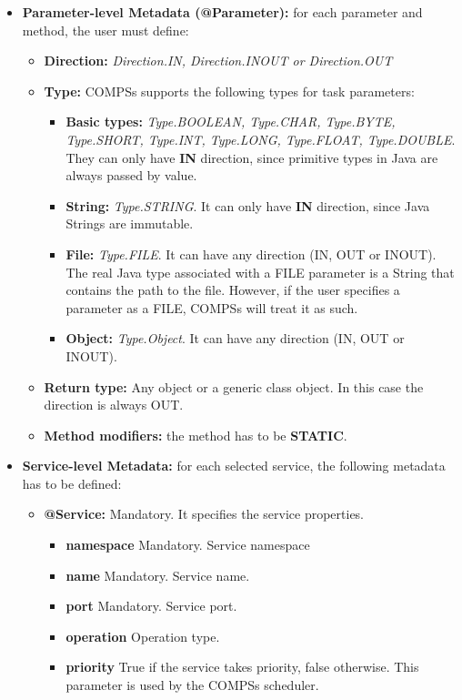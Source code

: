 \begin{itemize}
 \item {\bf Parameter-level Metadata (@Parameter):} for each parameter and method, the user must define:
       \begin{itemize}
        \item {\bf Direction:} {\it Direction.IN, Direction.INOUT or Direction.OUT}
        \item {\bf Type:} COMPSs supports the following types for task parameters:
              \begin{itemize}
               \item {\bf Basic types:} {\it Type.BOOLEAN, Type.CHAR, Type.BYTE, Type.SHORT, Type.INT, Type.LONG,
                     Type.FLOAT, Type.DOUBLE}. They can only have {\bf IN} direction, since primitive types in Java are
                     always passed by value.
               \item {\bf String:} {\it Type.STRING}. It can only have {\bf IN} direction, since Java Strings are immutable.
               \item {\bf File:} {\it Type.FILE}. It can have any direction (IN, OUT or INOUT). The real Java type associated
                     with a FILE parameter is a String that contains the path to the file. However, if the user specifies
                     a parameter as a FILE, COMPSs will treat it as such.
               \item {\bf Object:} {\it Type.Object}. It can have any direction (IN, OUT or INOUT).
              \end{itemize}
        \item {\bf Return type:} Any object or a generic class object. In this case the direction is always OUT.
        \item {\bf Method modifiers:} the method has to be {\bf STATIC}.
       \end{itemize}

 \item \textbf{Service-level Metadata:} for each selected service, the following metadata has to be defined:
       \begin{itemize}
         \item \textbf{@Service:} Mandatory. It specifies the service properties. 
		\begin{itemize}
			\item \textbf{namespace} Mandatory. Service namespace
			\item \textbf{name} Mandatory. Service name.
			\item \textbf{port} Mandatory. Service port.
			\item \textbf{operation} Operation type. 
			\item \textbf{priority} True if the service takes priority, false otherwise. This parameter is used by the COMPSs scheduler. 
		\end{itemize}
	\end{itemize}
\end{itemize}

